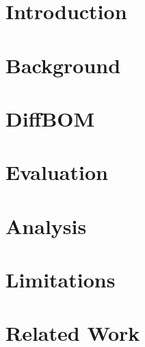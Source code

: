 \section{Introduction}
\label{sec:introduction}


\section{Background}
\label{sec:background}


\section{DiffBOM}
\label{sec:diffbom}


\section{Evaluation}
\label{sec:evaluation}


\section{Analysis}
\label{sec:analysis}



\section{Limitations}
\label{sec:analysis}


\section{Related Work}







